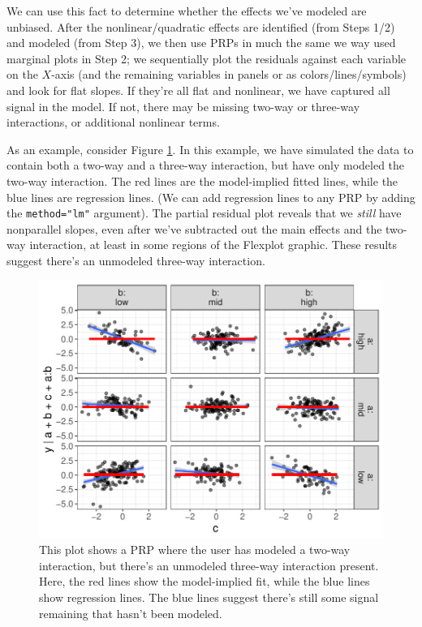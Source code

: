 \documentclass[
  man,floatsintext]{apa6}
\begin{document}
We can use this fact to determine whether the effects we've modeled are unbiased. After the nonlinear/quadratic effects are identified (from Steps 1/2) and modeled (from Step 3), we then use PRPs in much the same we way used marginal plots in Step 2; we sequentially plot the residuals against each variable on the \(X\)-axis (and the remaining variables in panels or as colors/lines/symbols) and look for flat slopes. If they're all flat and nonlinear, we have captured all signal in the model. If not, there may be missing two-way or three-way interactions, or additional nonlinear terms.

As an example, consider Figure \ref{fig:threeway}. In this example, we have simulated the data to contain both a two-way and a three-way interaction, but have only modeled the two-way interaction. The red lines are the model-implied fitted lines, while the blue lines are regression lines. (We can add regression lines to any PRP by adding the \texttt{method="lm"} argument). The partial residual plot reveals that we \emph{still} have nonparallel slopes, even after we've subtracted out the main effects and the two-way interaction, at least in some regions of the Flexplot graphic. These results suggest there's an unmodeled three-way interaction.

\begin{figure}

{\centering \includegraphics[width=0.7\linewidth]{visual_partitions_files/figure-latex/threeway-1} 

}

\caption{This plot shows a PRP where the user has modeled a two-way interaction, but there's an unmodeled three-way interaction present. Here, the red lines show the model-implied fit, while the blue lines show regression lines. The blue lines suggest there's still some signal remaining that hasn't been modeled.}\label{fig:threeway}
\end{figure}
\end{document}
